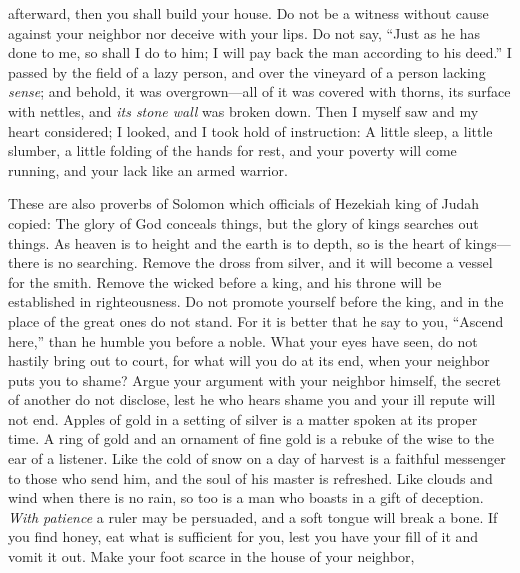 \begin{biblechapter}
afterward, then you shall build your house.
\verse Do not be a witness without cause against your neighbor 
nor deceive with your lips.
\verse Do not say, “Just as he has done to me, so shall I do to him; 
I will pay back the man according to his deed.”
\verse I passed by the field of a lazy person, 
and over the vineyard of a person lacking \textit{sense};
\verse and behold, it was overgrown—all of it was covered with thorns, its surface with nettles, 
and \textit{its stone wall} was broken down.
\verse Then I myself saw and my heart considered; 
I looked, and I took hold of instruction:
\verse A little sleep, a little slumber, 
a little folding of the hands for rest,
\verse and your poverty will come running, 
and your lack like an armed warrior.
\end{biblechapter}

\begin{biblechapter} %
 These are also proverbs of Solomon which officials of Hezekiah king of Judah copied:
\verse The glory of God conceals things, 
but the glory of kings searches out things.
\verse As heaven is to height and the earth is to depth, 
so is the heart of kings—there is no searching.
\verse Remove the dross from silver, 
and it will become a vessel for the smith.
\verse Remove the wicked before a king, 
and his throne will be established in righteousness.
\verse Do not promote yourself before the king, 
and in the place of the great ones do not stand.
\verse For it is better that he say to you, “Ascend here,” 
than he humble you before a noble. 
What your eyes have seen,
\verse do not hastily bring out to court, 
for what will you do at its end, 
when your neighbor puts you to shame?
\verse Argue your argument with your neighbor himself, 
the secret of another do not disclose,
\verse lest he who hears shame you 
and your ill repute will not end.
\verse Apples of gold in a setting of silver 
is a matter spoken at its proper time.
\verse A ring of gold and an ornament of fine gold 
is a rebuke of the wise to the ear of a listener.
\verse Like the cold of snow on a day of harvest 
is a faithful messenger to those who send him, 
and the soul of his master is refreshed.
\verse Like clouds and wind when there is no rain, 
so too is a man who boasts in a gift of deception.
\verse \textit{With patience} a ruler may be persuaded, 
and a soft tongue will break a bone.
\verse If you find honey, eat what is sufficient for you, 
lest you have your fill of it and vomit it out.
\verse Make your foot scarce in the house of your neighbor, 

\end{biblechapter}
